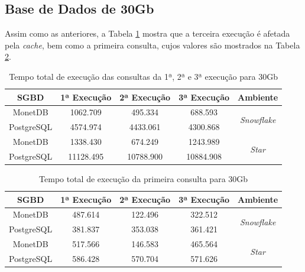 \subsection{Base de Dados de 30Gb}

Assim como as anteriores, a Tabela \ref{tab:queries_cache_30} mostra que a terceira execução é afetada pela \textit{cache}, bem como a primeira consulta, cujos valores são mostrados na Tabela \ref{tab:q1_cache_30}.

\begin{table}[htpb]
        \centering
        \caption{Tempo total de execução das consultas da 1ª, 2ª e 3ª execução para 30Gb}
        \label{tab:queries_cache_30}
        \begin{tabular}{|c|c|c|c|c|}
        \hline
        SGBD       & 1ª Execução & 2ª Execução & 3ª Execução & Ambiente                            \\ \hline
        MonetDB    & 1062.709    & 495.334     & 688.593     & \multirow{2}{*}{\textit{Snowflake}} \\ \cline{1-4}
        PostgreSQL & 4574.974    & 4433.061    & 4300.868    &                                     \\ \hline
        MonetDB    & 1338.430    & 674.249     & 1243.989    & \multirow{2}{*}{\textit{Star}}      \\ \cline{1-4}
        PostgreSQL & 11128.495   & 10788.900   & 10884.908   &                                     \\ \hline
        \end{tabular}
\end{table}

\begin{table}[htpb]
        \centering
        \caption{Tempo total de execução da primeira consulta para 30Gb}
        \label{tab:q1_cache_30}
        \begin{tabular}{|c|c|c|c|c|}
        \hline
        SGBD       & 1ª Execução & 2ª Execução & 3ª Execução & Ambiente                            \\ \hline
        MonetDB    & 487.614     & 122.496     & 322.512     & \multirow{2}{*}{\textit{Snowflake}} \\ \cline{1-4}
        PostgreSQL & 381.837     & 353.038     & 361.421     &                                     \\ \hline
        MonetDB    & 517.566     & 146.583     & 465.564     & \multirow{2}{*}{\textit{Star}}      \\ \cline{1-4}
        PostgreSQL & 586.428     & 570.704     & 571.626     &                                     \\ \hline
        \end{tabular}
\end{table}

